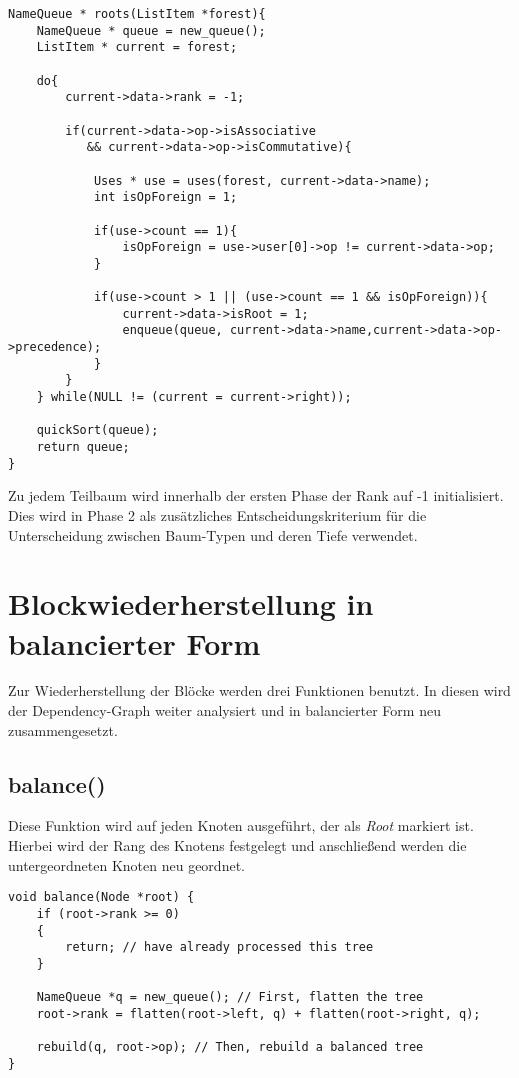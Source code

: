 \begin{lstlisting}[caption=Phase 1: Roots, label=list:roots]
NameQueue * roots(ListItem *forest){
	NameQueue * queue = new_queue();
	ListItem * current = forest;
	
	do{
		current->data->rank = -1;
		
		if(current->data->op->isAssociative 
		   && current->data->op->isCommutative){
			
			Uses * use = uses(forest, current->data->name);
			int isOpForeign = 1;          
			
			if(use->count == 1){
				isOpForeign = use->user[0]->op != current->data->op;
			}
			
			if(use->count > 1 || (use->count == 1 && isOpForeign)){               
				current->data->isRoot = 1;
				enqueue(queue, current->data->name,current->data->op->precedence);
			}
		}
	} while(NULL != (current = current->right));
	
	quickSort(queue);
	return queue;
}
\end{lstlisting}

Zu jedem Teilbaum wird innerhalb der ersten Phase der Rank auf -1 initialisiert. Dies wird in Phase 2 als zusätzliches Entscheidungskriterium für die  Unterscheidung zwischen Baum-Typen und deren Tiefe verwendet.

\section{Blockwiederherstellung in balancierter Form}
Zur Wiederherstellung der Blöcke werden drei Funktionen benutzt. In diesen wird der Dependency-Graph weiter analysiert und in balancierter Form neu zusammengesetzt.

\subsection{balance()}
Diese Funktion wird auf jeden Knoten ausgeführt, der als \textit{Root} markiert ist. Hierbei wird der Rang des Knotens festgelegt und anschließend werden die untergeordneten Knoten neu geordnet.\\

\begin{lstlisting}[caption=Funktion balance(), label=list:Funktion balace()]
void balance(Node *root) {
	if (root->rank >= 0)
	{
		return; // have already processed this tree
	}

	NameQueue *q = new_queue(); // First, flatten the tree
	root->rank = flatten(root->left, q) + flatten(root->right, q);

	rebuild(q, root->op); // Then, rebuild a balanced tree
}
\end{lstlisting}

